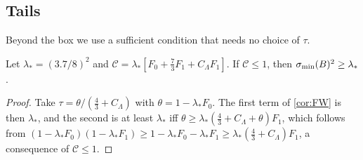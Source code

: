 \subsection{Tails}

Beyond the box we use a sufficient condition that needs no choice of $\tau$.

\begin{lemma}\label{lem:sufficient}
Let $\lambda_*=(3.7/8)^2$ and $\mathcal C=\lambda_*[F_0+\frac73F_1+C_\Lambda F_1]$. If $\mathcal C\le1$, then
$\sigma_{\min}(B)^2\ge \lambda_*$.
\end{lemma}

\begin{proof}
Take $\tau=\theta/(\frac43+C_\Lambda)$ with $\theta=1-\lambda_*F_0$. The first term of \cref{cor:FW} is then
$\lambda_*$, and the second is at least $\lambda_*$ iff $\theta\ge \lambda_*(\frac43+C_\Lambda+\theta)F_1$, which
follows from $(1-\lambda_*F_0)(1-\lambda_*F_1)\ge1-\lambda_*F_0-\lambda_*F_1\ge \lambda_*(\frac43+C_\Lambda)F_1$, a consequence of
$\mathcal C\le1$.
\end{proof}

